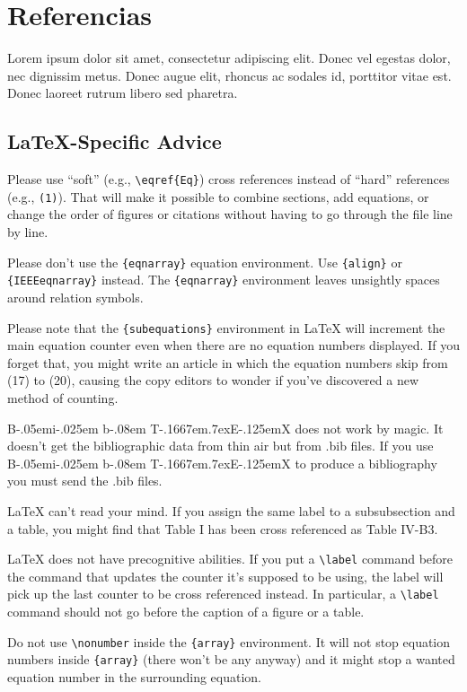 \documentclass[conference]{IEEEtran}
\def\BibTeX{{\rm B\kern-.05em{\sc i\kern-.025em b}\kern-.08em
    T\kern-.1667em\lower.7ex\hbox{E}\kern-.125emX}}
\begin{document}
\section{Referencias}
Lorem ipsum dolor sit amet, consectetur adipiscing elit. Donec vel egestas dolor, nec dignissim metus. Donec augue elit, rhoncus ac sodales id, porttitor vitae est. Donec laoreet rutrum libero sed pharetra.

\subsection{\LaTeX-Specific Advice}

Please use ``soft'' (e.g., \verb|\eqref{Eq}|) cross references instead
of ``hard'' references (e.g., \verb|(1)|). That will make it possible
to combine sections, add equations, or change the order of figures or
citations without having to go through the file line by line.

Please don't use the \verb|{eqnarray}| equation environment. Use
\verb|{align}| or \verb|{IEEEeqnarray}| instead. The \verb|{eqnarray}|
environment leaves unsightly spaces around relation symbols.

Please note that the \verb|{subequations}| environment in {\LaTeX}
will increment the main equation counter even when there are no
equation numbers displayed. If you forget that, you might write an
article in which the equation numbers skip from (17) to (20), causing
the copy editors to wonder if you've discovered a new method of
counting.

{\BibTeX} does not work by magic. It doesn't get the bibliographic
data from thin air but from .bib files. If you use {\BibTeX} to produce a
bibliography you must send the .bib files. 

{\LaTeX} can't read your mind. If you assign the same label to a
subsubsection and a table, you might find that Table I has been cross
referenced as Table IV-B3. 

{\LaTeX} does not have precognitive abilities. If you put a
\verb|\label| command before the command that updates the counter it's
supposed to be using, the label will pick up the last counter to be
cross referenced instead. In particular, a \verb|\label| command
should not go before the caption of a figure or a table.

Do not use \verb|\nonumber| inside the \verb|{array}| environment. It
will not stop equation numbers inside \verb|{array}| (there won't be
any anyway) and it might stop a wanted equation number in the
surrounding equation.
\end{document}
